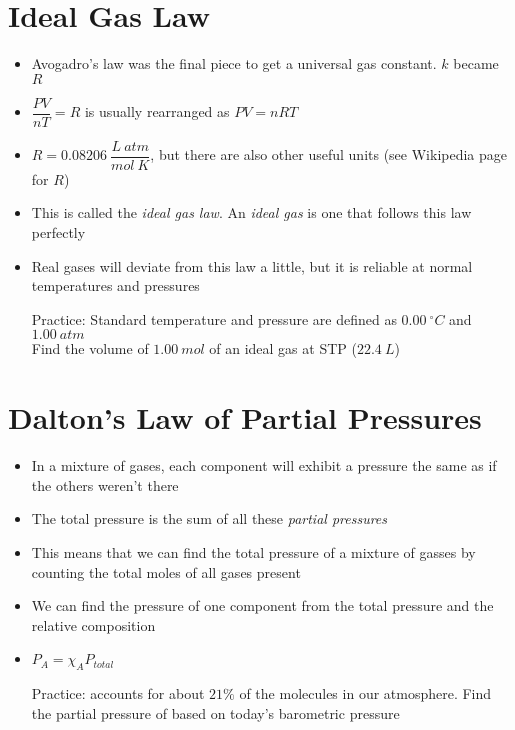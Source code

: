 \documentclass[12pt, openany, letterpaper]{memoir}
\begin{document}
\section{Ideal Gas Law}
\begin{itemize}
	\item Avogadro's law was the final piece to get a universal gas constant. $k$ became $R$
	\item $\dfrac{PV}{nT}=R$ is usually rearranged as $PV=nRT$
	\item $R=0.08206~\dfrac{L~atm}{mol~K}$, but there are also other useful units (see Wikipedia page for $R$)
	\item This is called the \emph{ideal gas law}. An \emph{ideal gas} is one that follows this law perfectly
	\item Real gases will deviate from this law a little, but it is reliable at normal temperatures and pressures
	
	Practice: Standard temperature and pressure are defined as $0.00~^\circ C$ and $1.00~atm$\\
	Find the volume of $1.00~mol$ of an ideal gas at STP ($22.4~L$)
\end{itemize}
\section{Dalton's Law of Partial Pressures}
\begin{itemize}
	\item In a mixture of gases, each component will exhibit a pressure the same as if the others weren't there
	\item The total pressure is the sum of all these \emph{partial pressures}
	\item This means that we can find the total pressure of a mixture of gasses by counting the total moles of all gases present
	\item We can find the pressure of one component from the total pressure and the relative composition
	\item $P_A=\chi_A P_{total}$
	
	Practice:  accounts for about $21\%$ of the molecules in our atmosphere. Find the partial pressure of  based on today's barometric pressure
\end{itemize}
\end{document}
